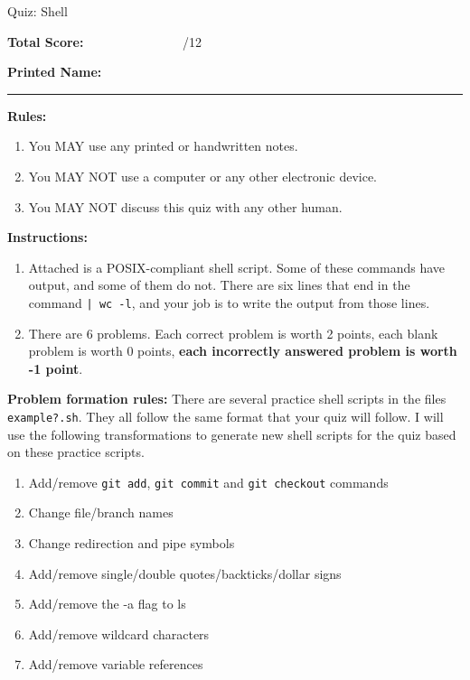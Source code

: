 \documentclass[10pt]{article}
\theoremstyle{definition}
\begin{document}
\begin{center}
{
\Large
    Quiz: Shell
}

    \vspace{0.1in}
\end{center}


\vspace{0.15in}
\noindent
\textbf{Total Score:} ~~~~~~~~~~~~~~~/12

\vspace{0.5in}
\noindent
\textbf{Printed Name:}

\noindent
\rule{\textwidth}{0.1pt}
\vspace{0.25in}

\noindent
\textbf{Rules:}
\begin{enumerate}
    \item You MAY use any printed or handwritten notes.
    \item You MAY NOT use a computer or any other electronic device.
    \item You MAY NOT discuss this quiz with any other human.
\end{enumerate}

\vspace{0.25in}
\noindent
\textbf{Instructions:}
\begin{enumerate}
    \item Attached is a POSIX-compliant shell script.
        Some of these commands have output, and some of them do not.
        There are six lines that end in the command \lstinline{| wc -l},
        and your job is to write the output from those lines.
    \item There are 6 problems.
        Each correct problem is worth 2 points,
        each blank problem is worth 0 points,
        \textbf{each incorrectly answered problem is worth -1 point}.
\end{enumerate}

\vspace{0.25in}
\noindent
\textbf{Problem formation rules:}
There are several practice shell scripts in the files \lstinline{example?.sh}.
They all follow the same format that your quiz will follow.
I will use the following transformations to generate new shell scripts for the quiz based on these practice scripts.
\begin{enumerate}
    \item Add/remove \lstinline{git add}, \lstinline{git commit} and \lstinline{git checkout} commands
    \item Change file/branch names
    \item Change redirection and pipe symbols
    \item Add/remove single/double quotes/backticks/dollar signs
    \item Add/remove the -a flag to ls
    \item Add/remove wildcard characters
    \item Add/remove variable references
\end{enumerate}
\end{document}
